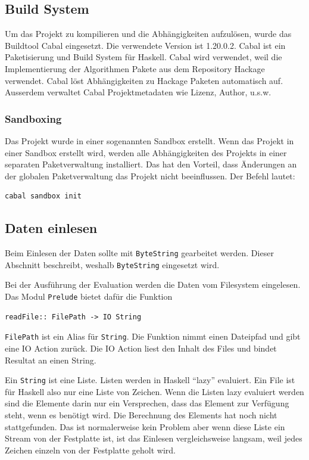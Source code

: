 \documentclass[a4paper, 12pt]{article}
\begin{document}
\subsection{Build System}
\label{sec:cabal}

Um das Projekt zu kompilieren und die Abhängigkeiten aufzulösen, wurde das Buildtool Cabal eingesetzt. Die verwendete Version ist 1.20.0.2. Cabal ist ein Paketisierung und Build System für Haskell. Cabal wird verwendet, weil die Implementierung der Algorithmen Pakete aus dem Repository Hackage verwendet. Cabal löst Abhängigkeiten zu Hackage Paketen automatisch auf. Ausserdem verwaltet Cabal Projektmetadaten wie Lizenz, Author, u.s.w.

\subsubsection{Sandboxing}
\label{sec:sanboxing}

Das Projekt wurde in einer sogenannten Sandbox erstellt. Wenn das Projekt in einer Sandbox erstellt wird, werden alle Abhängigkeiten des Projekts in einer separaten Paketverwaltung installiert. Das hat den Vorteil, dass Änderungen an der globalen Paketverwaltung das Projekt nicht beeinflussen. Der Befehl lautet:
\begin{verbatim}
cabal sandbox init
\end{verbatim}

\subsection{Daten einlesen}
\label{sec:readio}

Beim Einlesen der Daten sollte mit \verb|ByteString| gearbeitet werden. Dieser Abschnitt beschreibt, weshalb \verb|ByteString| eingesetzt wird.

Bei der Ausführung der Evaluation werden die Daten vom Filesystem eingelesen. Das Modul \verb|Prelude| bietet dafür die Funktion
\begin{verbatim}
readFile:: FilePath -> IO String
\end{verbatim}
 \verb|FilePath| ist ein Alias für \verb|String|. Die Funktion nimmt einen Dateipfad und gibt eine IO Action zurück. Die IO Action liest den Inhalt des Files und bindet Resultat an einen String.

Ein \verb|String| ist eine Liste. Listen werden in Haskell ``lazy'' evaluiert. Ein File ist für Haskell also nur eine Liste von Zeichen. Wenn die Listen lazy evaluiert werden sind die Elemente darin nur ein Versprechen, dass das Element zur Verfügung steht, wenn es benötigt wird. Die Berechnung des Elements hat noch nicht stattgefunden. Das ist normalerweise kein Problem aber wenn diese Liste ein Stream von der Festplatte ist, ist das Einlesen vergleichsweise langsam, weil jedes Zeichen einzeln von der Festplatte geholt wird.
\end{document}
